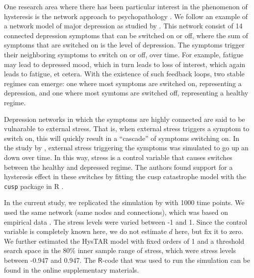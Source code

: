 \documentclass{article}
\begin{document}
One research area where there has been particular interest in the phenomenon of hysteresis is the network approach to psychopathology \citep{borsboom_psychometric_2008}.
We follow an example of a network model of major depression as studied by \citet{cramer_major_2016}.
This network consist of 14 connected depression symptoms that can be switched on or off, where the sum of symptoms that are switched on is the level of depression.
The symptoms trigger their neighboring symptoms to switch on or off, over time. For example, fatigue may lead to depressed mood, which in turn leads to loss of interest, which again leads to fatigue, et cetera.
With the existence of such feedback loops, two stable regimes can emerge: one where most symptoms are switched on, representing a depression, and one where most symtoms are switched off, representing a healthy regime.

Depression networks in which the symptoms are highly connected are said to be vulnarable to external stress.
That is, when external stress triggers a symptom to switch on, this will  quickly result in a ``cascade'' of symptoms switching on.
In the study by \citet{cramer_major_2016}, external stress triggering the symptoms was simulated to go up an down over time.
In this way, stress is a control variable that causes switches between the healthy and depressed regime.
The authors found support for a hysteresis effect in these switches by fitting the cusp catastrophe model with the \texttt{cusp} package in \textsf{R} \citep{R, R_cusp}.

In the current study, we replicated the simulation by \citet{cramer_major_2016} with 1000 time points. 
We used the same network (same nodes and connections), which was based on empirical data \citep{network_data}. 
The stress levels were varied between -1 and 1.
Since the control variable is completely known here, we do not estimate $d$ here, but fix it to zero.
We further estimated the HysTAR model with fixed orders of 1 and a threshold search space in the 80\% inner sample range of stress, which were stress levels between -0.947 and 0.947.
The $\mathsf{R}$-code that was used to run the simulation can be found in the online supplementary materials.
\end{document}
